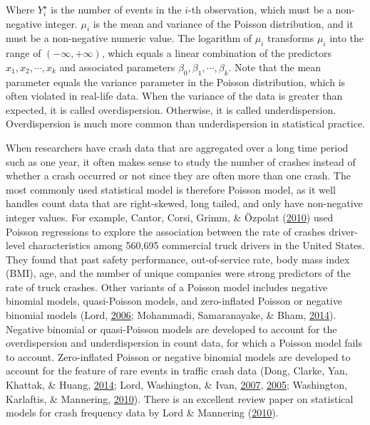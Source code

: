 \documentclass[12pt]{book}
\numberwithin{equation}{chapter}
\begin{document}
Where \(Y_i^\star\) is the number of events in the \(i\)-th observation, which must be a non-negative integer. \(\mu_i\) is the mean and variance of the Poisson distribution, and it must be a non-negative numeric value. The logarithm of \(\mu_i\) transforms \(\mu_i\) into the range of \((-\infty, +\infty)\), which equals a linear combination of the predictors \(x_1, x_2, \cdots, x_k\) and associated parameters \(\beta_0, \beta_1, \cdots, \beta_k\). Note that the mean parameter equals the variance parameter in the Poisson distribution, which is often violated in real-life data. When the variance of the data is greater than expected, it is called overdispersion. Otherwise, it is called underdispersion. Overdispersion is much more common than underdispersion in statistical practice.

When researchers have crash data that are aggregated over a long time period such as one year, it often makes sense to study the number of crashes instead of whether a crash occurred or not since they are often more than one crash. The most commonly used statistical model is therefore Poisson model, as it well handles count data that are right-skewed, long tailed, and only have non-negative integer values. For example, Cantor, Corsi, Grimm, \& Özpolat (\protect\hyperlink{ref-cantor2010driver}{2010}) used Poisson regressions to explore the association between the rate of crashes driver-level characteristics among 560,695 commercial truck drivers in the United States. They found that past safety performance, out-of-service rate, body mass index (BMI), age, and the number of unique companies were strong predictors of the rate of truck crashes.
Other variants of a Poisson model includes negative binomial models, quasi-Poisson models, and zero-inflated Poisson or negative binomial models (Lord, \protect\hyperlink{ref-lord2006modeling}{2006}; Mohammadi, Samaranayake, \& Bham, \protect\hyperlink{ref-mohammadi2014crash}{2014}). Negative binomial or quasi-Poisson models are developed to account for the overdispersion and underdispersion in count data, for which a Poisson model fails to account. Zero-inflated Poisson or negative binomial models are developed to account for the feature of rare events in traffic crash data (Dong, Clarke, Yan, Khattak, \& Huang, \protect\hyperlink{ref-dong2014multivariate}{2014}; Lord, Washington, \& Ivan, \protect\hyperlink{ref-lord2007further}{2007}, \protect\hyperlink{ref-lord2005poisson}{2005}; Washington, Karlaftis, \& Mannering, \protect\hyperlink{ref-washington2010statistical}{2010}). There is an excellent review paper on statistical models for crash frequency data by Lord \& Mannering (\protect\hyperlink{ref-lord2010statistical}{2010}).
\end{document}
